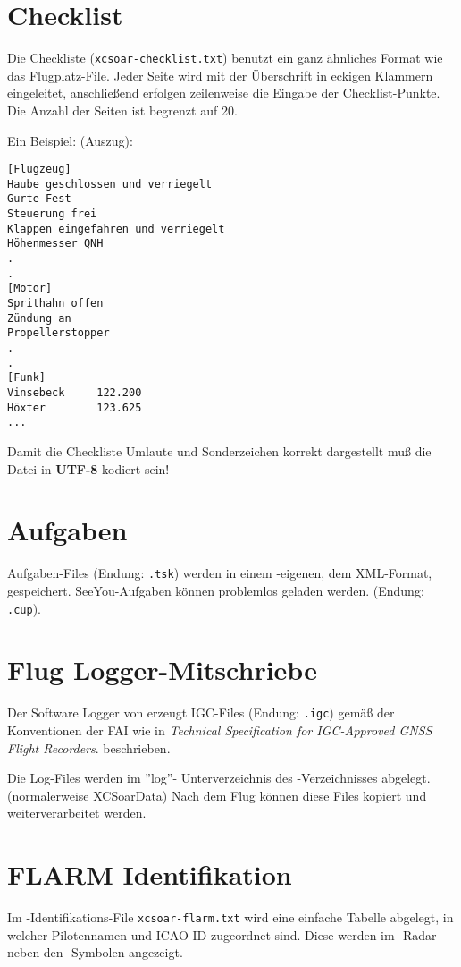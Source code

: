 \section{Checklist}\label{sec:checklist-file}

Die Checkliste  (\verb|xcsoar-checklist.txt|) benutzt ein ganz ähnliches Format
wie das Flugplatz-File. 
Jeder Seite wird mit der Überschrift in eckigen Klammern eingeleitet, anschließend erfolgen
zeilenweise die Eingabe der Checklist-Punkte. Die Anzahl der Seiten ist begrenzt auf 20.

Ein Beispiel: (Auszug):
\begin{verbatim}
[Flugzeug]
Haube geschlossen und verriegelt
Gurte Fest
Steuerung frei
Klappen eingefahren und verriegelt
Höhenmesser QNH
.
.
[Motor]
Sprithahn offen
Zündung an
Propellerstopper 
.
.
[Funk]
Vinsebeck     122.200
Höxter        123.625
...
\end{verbatim}
Damit die Checkliste Umlaute und Sonderzeichen korrekt dargestellt muß die Datei \warning 
in \textbf{UTF-8} kodiert sein!

\section{Aufgaben }

Aufgaben-Files  (Endung: \verb|.tsk|) werden in einem \xc -eigenen, dem  XML-Format, gespeichert.
SeeYou-Aufgaben können problemlos geladen werden. (Endung: \verb|.cup|).

\section{Flug Logger-Mitschriebe} \label{sec:logfiles}
Der Software Logger von \xc erzeugt  IGC-Files (Endung: \verb|.igc|)
gemäß der Konventionen der FAI wie in  {\em Technical Specification for IGC-Approved GNSS Flight Recorders}.
beschrieben.

Die Log-Files werden  im ''log''- Unterverzeichnis des \xc -Verzeichnisses abgelegt. (normalerweise XCSoarData)
Nach dem Flug können diese Files kopiert und weiterverarbeitet werden.

\section{FLARM Identifikation}\label{sec:flarm-ident-file}

Im  \fl-Identifikations-File  \verb|xcsoar-flarm.txt| wird eine einfache Tabelle
abgelegt, in welcher Pilotennamen und ICAO-ID zugeordnet sind.
Diese werden im \fl-Radar neben den \fl-Symbolen angezeigt.

